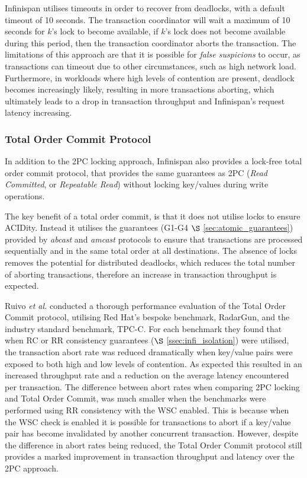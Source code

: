 	        Infinispan utilises timeouts in order to recover from deadlocks, with a default timeout of 10 seconds.  The transaction coordinator will wait a maximum of 10 seconds for $k$'s lock to become available, if $k$'s lock does not become available during this period, then the transaction coordinator aborts the transaction.  The limitations of this approach are that it is possible for \emph{false suspicions} to occur, as transactions can timeout due to other circumstances, such as high network load.  Furthermore, in workloads where high levels of contention are present, deadlock becomes increasingly likely, resulting in more transactions aborting, which ultimately leads to a drop in transaction throughput and Infinispan's request latency increasing.  

	    \subsubsection{Total Order Commit Protocol} \label{sec:to_commit}
	    In addition to the 2PC locking approach, Infinispan also provides a lock-free total order commit protocol, that provides the same guarantees as 2PC (\emph{Read Committed}, or \emph{Repeatable Read}) without locking key/values during write operations.  
	    
	    The key benefit of a total order commit, is that it does not utilise locks to ensure ACIDity.  Instead it utilises the guarantees (G1-G4 $\S$ \ref{sec:atomic_guarantees}) provided by \emph{abcast} and \emph{amcast} protocols to ensure that transactions are processed sequentially and in the same total order at all destinations.  The absence of locks removes the potential for distributed deadlocks, which reduces the total number of aborting transactions, therefore an increase in transaction throughput is expected.  
	    
	    Ruivo \emph{et al.}\citep{Ruivo:2011:ETO:2120967.2121604} conducted a thorough performance evaluation of the Total Order Commit protocol, utilising Red Hat's bespoke benchmark, RadarGun\citep{RadarGun}, and the industry standard benchmark, TPC-C\citep{TPC-C}.  For each benchmark they found that when RC or RR consistency guarantees ($\S$ \ref{ssec:infi_isolation}) were utilised, the transaction abort rate was reduced dramatically when key/value pairs were exposed to both high and low levels of contention.  As expected this resulted in an increased throughput rate and a reduction on the average latency encountered per transaction.  The difference between abort rates when comparing 2PC locking and Total Order Commit, was much smaller when the benchmarks were performed using RR consistency with the WSC enabled.  This is because when the WSC check is enabled it is possible for transactions to abort if a key/value pair has become invalidated by another concurrent transaction.  However, despite the difference in abort rates being reduced, the Total Order Commit protocol still provides a marked improvement in transaction throughput and latency over the 2PC approach.  
	    
